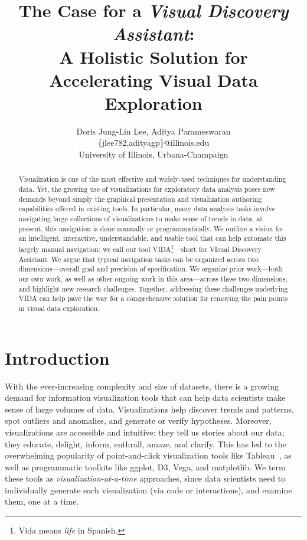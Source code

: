 \documentclass[11pt]{article}
\def\plainauthor{Doris Jung-Lin Lee, Aditya Parameswaran}
\newcommand{\vida}{\textsc{VIDA}\xspace}
\begin{document}
\title{The Case for a {\em Visual Discovery Assistant}: \\ A Holistic Solution for Accelerating Visual Data Exploration}

\author{\plainauthor\\
\{jlee782,adityagp\}@illinois.edu\\
University of Illinois, Urbana-Champaign}
\maketitle
\begin{abstract}
Visualization is one of the 
most effective and widely-used 
techniques for understanding data. 
Yet, the growing use of visualizations 
for exploratory data analysis 
poses new demands beyond simply 
the graphical presentation 
and visualization authoring 
capabilities offered in existing tools. 
In particular, many data analysis
tasks involve navigating large 
collections of visualizations to make sense
of trends in data;
at present, this navigation is done manually or
programmatically. 
We outline a vision for an
intelligent, interactive, understandable,
and usable tool 
that can help automate
this largely manual navigation: we call our tool \vida\footnote{Vida means {\em life} in Spanish.}---short for {VIsual Discovery Assistant}. 
We argue that typical navigation tasks can be 
organized across two dimensions---overall goal 
and precision of specification.
We organize prior work---both our own work, as well
as other ongoing work in this area---across 
these two dimensions, and highlight
new research challenges.
Together, addressing these challenges underlying \vida
can help pave the way for a comprehensive
solution for removing the pain points
in visual data exploration.
\end{abstract}


\section{Introduction}%
\par With the ever-increasing complexity 
and size of datasets,
there is a growing demand for 
information visualization tools
that can help data scientists make sense of large
volumes of data.
Visualizations help discover 
trends and patterns, 
spot outliers and anomalies, 
and generate or verify hypotheses.
Moreover, 
visualizations are accessible and intuitive: 
they tell us stories about our data; 
they educate, delight, inform, 
enthrall, amaze, and clarify.
This has led to the overwhelming popularity
of point-and-click visualization tools like Tableau~\cite{Stolte2002},
as well as programmatic toolkits like ggplot, D3, Vega, and matplotlib. 
We term these tools as {\em visualization-at-a-time} approaches, since
data scientists need to individually 
generate each visualization (via code or interactions),
and examine them, 
one at a time.
\end{document}
